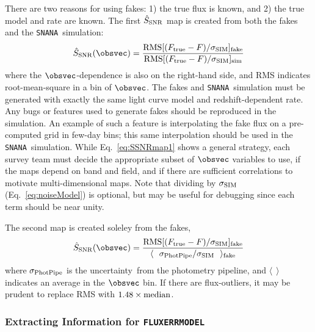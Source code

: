 \documentclass[12pt]{article}
\newcommand{\unc}{uncertainty}
\newcommand{\snana}{{\tt SNANA}}
\newcommand{\sigSIM}{\sigma_{\rm SIM}}
\newcommand{\SSNR}{\hat{S}_{\rm SNR}}
\begin{document}
{\newcommand{\Ftrue}{F_{\rm true}}

There are two reasons for using fakes: 
1) the true flux is known, and 2) the true model and rate are known.
The first $\SSNR$ map is created from both the fakes and the 
\snana\ simulation:
\begin{equation}
  \SSNR(\obsvec) = 
       \frac{ {\rm RMS}[(\Ftrue-F)/\sigSIM ]_{\rm fake} }
            { {\rm RMS}[(\Ftrue-F)/\sigSIM ]_{\rm sim} }
   \label{eq:SSNRmap1}
\end{equation}
%
where the $\obsvec$-dependence is also on the right-hand side,
and RMS indicates root-mean-square in a bin of $\obsvec$.
The fakes and \snana\ simulation  must be generated
with exactly the same light curve model and redshift-dependent rate.
Any bugs or features used to generate fakes should be reproduced 
in the simulation. An example of such a feature is interpolating
the fake flux on a pre-computed grid in few-day bins; this same
interpolation should be used in the \snana\ simulation.
While Eq.~\ref{eq:SSNRmap1} shows a general strategy, each survey
team must decide 
the appropriate subset of $\obsvec$ variables to use,
if the maps depend on band and field, and
if there are sufficient correlations to motivate multi-dimensional maps.
Note that dividing by $\sigSIM$ (Eq.~\ref{eq:noiseModel}) is optional, 
but may be useful for debugging since each term should be near unity.

\newcommand{\sigPIPE}{\sigma_{\rm PhotPipe}}

The second map is created soleley from the fakes,
%
\begin{equation}
  \SSNR(\obsvec) = 
       \frac{ {\rm RMS}[(\Ftrue-F)/\sigSIM ]_{\rm fake} }
            { \langle~~\sigPIPE/\sigSIM ~~\rangle_{\rm fake} }
   \label{eq:SSNRmap2}
\end{equation}
%
where $\sigPIPE$ is the \unc\ from the photometry pipeline,
and $\langle~~\rangle$ indicates an average in the $\obsvec$ bin.
If there are flux-outliers, it may be prudent to replace RMS
with $1.48\times {\rm median}$.

\subsubsection{Extracting Information for {\tt FLUXERRMODEL} }
\label{sss:fluxerrmap_info}

}
\end{document}
